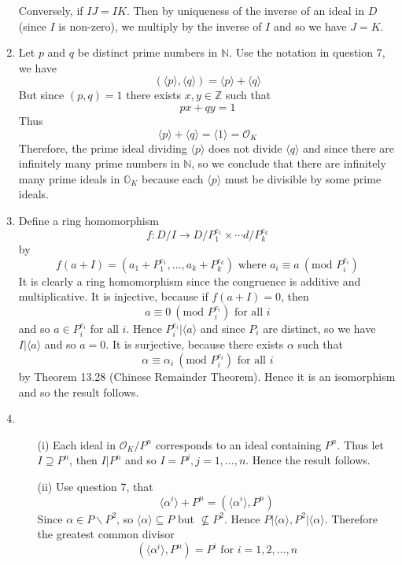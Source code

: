 \begin{enumerate}
     Conversely, if $IJ=IK$. Then by uniqueness of the inverse of an ideal in $D$ (since $I$ is non-zero), we multiply by the inverse of $I$ and so we have $J=K$.
\item Let $p$ and $q$ be distinct prime numbers in $\mathbb{N}$. Use the notation in question 7, we have
    $$(\langle p \rangle, \langle q \rangle)=\langle p \rangle +\langle q \rangle$$
    But since $(p,q)=1$ there exists $x,y \in \mathbb{Z}$ such that
    $$px+qy=1$$
    Thus $$\langle p \rangle +\langle q \rangle=\langle 1 \rangle =\mathcal{O}_K$$
    Therefore, the prime ideal dividing $\langle p \rangle$ does not divide $\langle q \rangle$ and since there are infinitely many prime numbers in $\mathbb{N}$, so we conclude that there are infinitely many prime ideals in $\mathbb{O}_K$ because each $\langle p \rangle$ must be divisible by some prime ideals.
\item Define a ring homomorphism
    $$f: D/I \rightarrow D/P^{e_1}_1 \times \cdots d/P^{e_k}_k$$
    by
    $$f(a+I)=(a_1+P^{e_1}_1,\ldots,a_k+P^{e_k}_k) \text{ where } a_i \equiv a~(\text{mod } P^{e_i}_i)$$
    It is clearly a ring homomorphism since the congruence is additive and multiplicative. It is injective,
    because if $f(a+I)=0$, then
    $$a \equiv 0~(\text{mod } P^{e_i}_i) \text{ for all } i$$
    and so $a \in P^{e_i}_i$ for all $i$. Hence $P^{e_i}_i \big| \langle a \rangle$ and since $P_i$ are distinct, so we have $I \big| \langle a \rangle$ and so $a=0$.
    It is surjective, because there exists $\alpha$ such that
    $$\alpha \equiv \alpha_i~(\text{mod } P^{e_i}_i) \text{ for all } i$$
    by Theorem 13.28 (Chinese Remainder Theorem). Hence it is an isomorphism and so the result follows.\\
\item \begin{enumerate}
    \item[(i)] Each ideal in $\mathcal{O}_K/P^n$ corresponds to an ideal containing $P^n$. Thus let $I \supseteq P^n$, then $I \big|P^n$ and so $I=P^j,j=1,\ldots,n$. Hence the result follows.\\
    \item[(ii)] Use question 7, that
    $$\langle \alpha^i \rangle + P^n = (\langle \alpha^i \rangle, P^n)$$
    Since $\alpha \in P \backslash P^2$, so $\langle \alpha \rangle \subseteq P$ but $\not \subseteq P^2$.
    Hence
    $P \big| \langle \alpha \rangle, P^2 \big| \langle \alpha \rangle$.
    Therefore the greatest common divisor
    $$(\langle \alpha^i \rangle, P^n)=P^i \text{ for } i=1,2,\ldots,n$$

\end{enumerate}
\end{enumerate}
